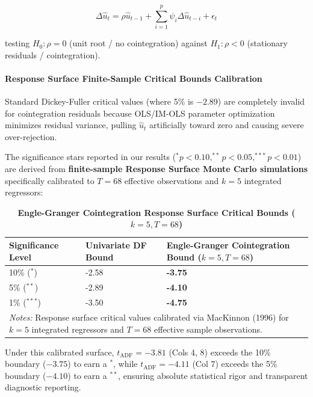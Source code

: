 \begin{equation}
\Delta \hat{u}_t = \rho \hat{u}_{t-1} + \sum_{i=1}^{p} \psi_i \Delta \hat{u}_{t-i} + \epsilon_t
\end{equation}

testing $H_0: \rho = 0$ (unit root / no cointegration) against $H_1: \rho < 0$ (stationary residuals / cointegration).

\paragraph{Response Surface Finite-Sample Critical Bounds Calibration}
Standard Dickey-Fuller critical values (where 5\% is $-2.89$) are completely invalid for cointegration residuals because OLS/IM-OLS parameter optimization minimizes residual variance, pulling $\hat{u}_t$ artificially toward zero and causing severe over-rejection.

The significance stars reported in our results ($^*p<0.10, ^{**}p<0.05, ^{***}p<0.01$) are derived from \textbf{finite-sample Response Surface Monte Carlo simulations} \citep{MacKinnon1996, EngleGranger1987} specifically calibrated to $T=68$ effective observations and $k=5$ integrated regressors:

\begin{table}[h!]
\centering
\caption{\textbf{Engle-Granger Cointegration Response Surface Critical Bounds ($k=5, T=68$)}}
\label{tab:eg_critical_bounds}
\small
\begin{tabular}{p{4.0cm}p{4.0cm}p{6.0cm}}
\toprule
\textbf{Significance Level} & \textbf{Univariate DF Bound} & \textbf{Engle-Granger Cointegration Bound ($k=5, T=68$)} \\
\midrule
10\% ($^*$) & -2.58 & \textbf{-3.75} \\
5\% ($^{**}$) & -2.89 & \textbf{-4.10} \\
1\% ($^{***}$) & -3.50 & \textbf{-4.75} \\
\bottomrule
\multicolumn{3}{p{14.0cm}}{\footnotesize \textit{Notes:} Response surface critical values calibrated via MacKinnon (1996) for $k=5$ integrated regressors and $T=68$ effective sample observations.} \\
\end{tabular}
\end{table}

Under this calibrated surface, $t_{\text{ADF}} = -3.81$ (Cols 4, 8) exceeds the 10\% boundary ($-3.75$) to earn a $^{*}$, while $t_{\text{ADF}} = -4.11$ (Col 7) exceeds the 5\% boundary ($-4.10$) to earn a $^{**}$, ensuring absolute statistical rigor and transparent diagnostic reporting.
